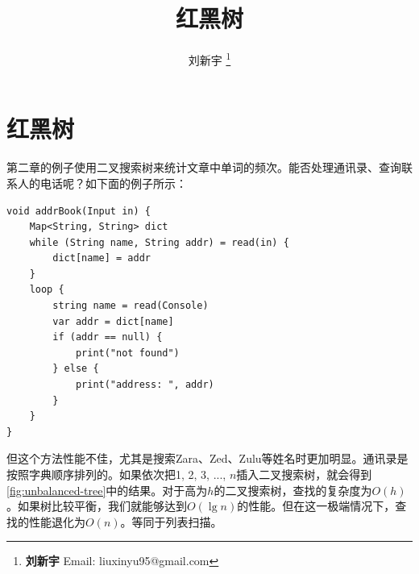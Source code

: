 \documentclass[b5paper]{ctexart}
\begin{document}
\title{红黑树}

\author{刘新宇
\thanks{{\bfseries 刘新宇} \newline
  Email: liuxinyu95@gmail.com \newline}
  }

\maketitle
\fi


\ifx\wholebook\relax
\chapter{红黑树}
\fi

第二章的例子使用二叉搜索树来统计文章中单词的频次。能否处理通讯录、查询联系人的电话呢？如下面的例子所示：

\lstset{frame = single}
\begin{lstlisting}[language=Bourbaki]
void addrBook(Input in) {
    Map<String, String> dict
    while (String name, String addr) = read(in) {
        dict[name] = addr
    }
    loop {
        string name = read(Console)
        var addr = dict[name]
        if (addr == null) {
            print("not found")
        } else {
            print("address: ", addr)
        }
    }
}
\end{lstlisting}

但这个方法性能不佳，尤其是搜索Zara、Zed、Zulu等姓名时更加明显。通讯录是按照字典顺序排列的。如果依次把1, 2, 3, ..., $n$插入二叉搜索树，就会得到\cref{fig:unbalanced-tree}中的结果。对于高为$h$的二叉搜索树，查找的复杂度为$O(h)$。如果树比较平衡，我们就能够达到$O(\lg n)$的性能。但在这一极端情况下，查找的性能退化为$O(n)$。等同于列表扫描。
\end{document}
